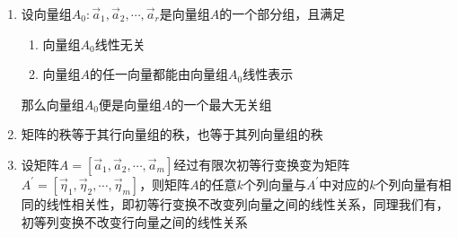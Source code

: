 \documentclass[12pt,a4paper,UTF8]{book}
\begin{document}
\begin{enumerate}
\item 设向量组$A_0:\vec{a}_1,\vec{a}_2,\cdots,\vec{a}_r$是向量组$A$的一个部分组，且满足
\begin{enumerate}
\item 向量组$A_0$线性无关
\item 向量组$A$的任一向量都能由向量组$A_0$线性表示
\end{enumerate}
那么向量组$A_0$便是向量组$A$的一个最大无关组
\item 矩阵的秩等于其行向量组的秩，也等于其列向量组的秩
\item 设矩阵$A=\left[\vec{a}_1,\vec{a}_2,\cdots,\vec{a}_m\right]$经过有限次初等行变换变为矩阵$A^{\prime}=\left[\vec{\eta}_1,\vec{\eta}_2,\cdots,\vec{\eta}_m\right]$，则矩阵$A$的任意$k$个列向量与$A^{\prime}$中对应的$k$个列向量有相同的线性相关性，即初等行变换不改变列向量之间的线性关系，同理我们有，初等列变换不改变行向量之间的线性关系
\end{enumerate}
\end{document}
